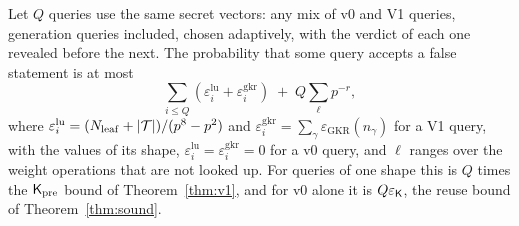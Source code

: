 \begin{theorem}
\label{thm:v1kpre}
Let $Q$ queries use the same secret vectors: any mix of v0 and V1 queries, generation queries
included, chosen adaptively, with the verdict of each one revealed before the next. The probability
that some query accepts a false statement is at most
\[
  \sum_{i\le Q}(\varepsilon^{\mathrm{lu}}_i+\varepsilon^{\mathrm{gkr}}_i)\;+\;Q\sum_\ell p^{-r},
\]
where $\varepsilon^{\mathrm{lu}}_i=(N_{\mathrm{leaf}}+|\mathcal{T}|)/(p^8-p^2)$ and $\varepsilon^{\mathrm{gkr}}_i=\sum_\gamma\varepsilon_{\mathrm{GKR}}(n_\gamma)$
for a V1 query, with the values of its shape, $\varepsilon^{\mathrm{lu}}_i=\varepsilon^{\mathrm{gkr}}_i=0$ for a v0 query, and $\ell$ ranges
over the weight operations that are not looked up. For queries of one shape this is $Q$ times the
$\mathsf{K}_{\mathrm{pre}}$ bound of Theorem~\ref{thm:v1}, and for v0 alone it is $Q\varepsilon_{\mathsf{K}}$, the reuse bound
of Theorem~\ref{thm:sound}.
\end{theorem}

